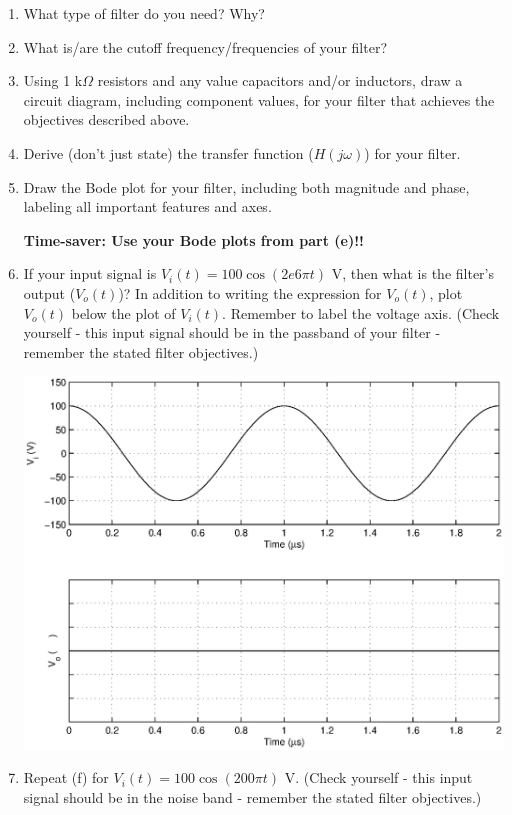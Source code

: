 \begin{enumerate}
\item What type of filter do you need?  Why?
\vspace*{1.0in}
\item What is/are the cutoff frequency/frequencies of your filter?

\newpage
%
\item Using 1 k$\Omega$ resistors and any value capacitors and/or inductors,
draw a circuit diagram, including component values, for your filter that
achieves the objectives described above.
\vspace*{3.0in}
\item Derive (don't just state) the transfer function ($H(j\omega)$) for your
filter.
\vspace*{2.5in}
\item Draw the Bode plot for your filter, including both magnitude and phase, labeling all important features and axes.

\newpage
%
\vspace*{0.5in}
\centerline{\bf \Large Time-saver: Use your Bode plots from part (e)!!}

\item If your input signal is $V_i(t) = 100 \cos(2e6\pi t)$ V, then what is the
filter's output ($V_o(t)$)?  In addition to writing the expression for
$V_o(t)$, plot $V_o(t)$ below the plot of $V_i(t)$.  Remember to label the
voltage axis.  (Check yourself - this input signal should be in the passband of
your filter - remember the stated filter objectives.)

\hspace*{0.4\linewidth}\includegraphics[width=0.6\linewidth]{hpf/plot_f.eps}

\vspace*{0.5in}

\item Repeat (f) for $V_i(t) = 100 \cos(200\pi t)$ V. (Check yourself - this
input signal should be in the noise band - remember the stated filter
objectives.)


\end{enumerate}
